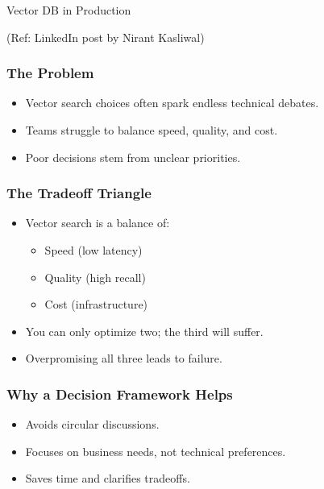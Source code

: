 \begin{frame}[fragile]\frametitle{}
\begin{center}
{\Large Vector DB in Production}

{\tiny (Ref: LinkedIn post by Nirant Kasliwal)}
\end{center}
\end{frame}


\begin{frame}[fragile]\frametitle{The Problem}
\begin{itemize}
    \item Vector search choices often spark endless technical debates.
    \item Teams struggle to balance speed, quality, and cost.
    \item Poor decisions stem from unclear priorities.
\end{itemize}
\end{frame}

\begin{frame}[fragile]\frametitle{The Tradeoff Triangle}
\begin{itemize}
    \item Vector search is a balance of:
    \begin{itemize}
        \item Speed (low latency)
        \item Quality (high recall)
        \item Cost (infrastructure)
    \end{itemize}
    \item You can only optimize two; the third will suffer.
    \item Overpromising all three leads to failure.
\end{itemize}
\end{frame}

\begin{frame}[fragile]\frametitle{Why a Decision Framework Helps}
\begin{itemize}
    \item Avoids circular discussions.
    \item Focuses on business needs, not technical preferences.
    \item Saves time and clarifies tradeoffs.
\end{itemize}
\end{frame}


